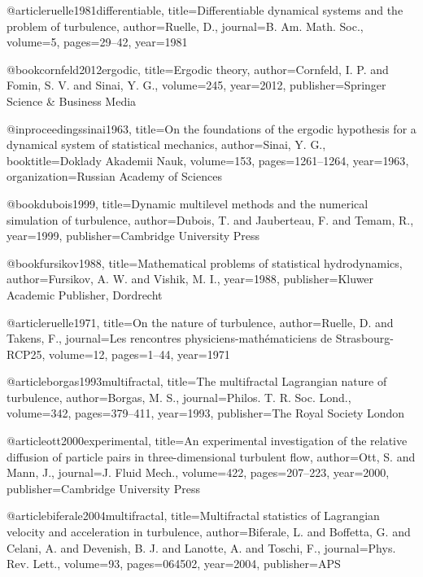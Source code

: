   @article{ruelle1981differentiable,
    title={{Differentiable dynamical systems and the problem of turbulence}},
    author={Ruelle, D.},
    journal={B. Am. Math. Soc.},
    volume={5},
    pages={29--42},
    year={1981}
  }


  @book{cornfeld2012ergodic,
    title={{Ergodic theory}},
    author={Cornfeld, I. P. and Fomin, S. V. and Sinai, Y. G.},
    volume={245},
    year={2012},
    publisher={Springer Science \& Business Media}
  }

  @inproceedings{sinai1963,
    title={{On the foundations of the ergodic hypothesis for a dynamical system of statistical mechanics}},
    author={Sinai, Y. G.},
    booktitle={Doklady Akademii Nauk},
    volume={153},
    pages={1261--1264},
    year={1963},
    organization={Russian Academy of Sciences}
  }

  @book{dubois1999,
    title={{Dynamic multilevel methods and the numerical simulation of turbulence}},
    author={Dubois, T. and Jauberteau, F. and Temam, R.},
    year={1999},
    publisher={Cambridge University Press}
  }

  @book{fursikov1988,
    title={{Mathematical problems of statistical hydrodynamics}},
    author={Fursikov, A. W. and Vishik, M. I.},
    year={1988},
    publisher={Kluwer Academic Publisher, Dordrecht}
  }

  @article{ruelle1971,
    title={{On the nature of turbulence}},
    author={Ruelle, D. and Takens, F.},
    journal={Les rencontres physiciens-math{\'e}maticiens de Strasbourg-RCP25},
    volume={12},
    pages={1--44},
    year={1971}
  }




  @article{borgas1993multifractal,
    title={{The multifractal Lagrangian nature of turbulence}},
    author={Borgas, M. S.},
    journal={Philos. T. R. Soc. Lond.},
    volume={342},
    pages={379--411},
    year={1993},
    publisher={The Royal Society London}
  }

  @article{ott2000experimental,
    title={{An experimental investigation of the relative diffusion of particle pairs in three-dimensional turbulent flow}},
    author={Ott, S. and Mann, J.},
    journal={J. Fluid Mech.},
    volume={422},
    pages={207--223},
    year={2000},
    publisher={Cambridge University Press}
  }

  @article{biferale2004multifractal,
    title={{Multifractal statistics of Lagrangian velocity and acceleration in turbulence}},
    author={Biferale, L. and Boffetta, G. and Celani, A. and Devenish, B. J. and Lanotte, A. and Toschi, F.},
    journal={Phys. Rev. Lett.},
    volume={93},
    pages={064502},
    year={2004},
    publisher={APS}
  }

